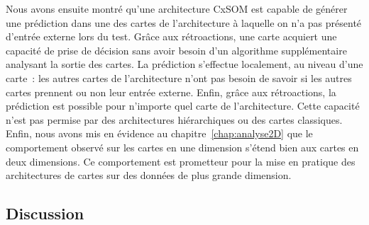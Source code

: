 Nous avons ensuite montré qu'une architecture CxSOM est capable de générer une prédiction dans une des cartes de l'architecture à laquelle on n'a pas présenté d'entrée externe lors du test. 
Grâce aux rétroactions, une carte acquiert une capacité de prise de décision sans avoir besoin d'un algorithme supplémentaire analysant la sortie des cartes. 
La prédiction s'effectue localement, au niveau d'une carte~: les autres cartes de l'architecture n'ont pas besoin de savoir si les autres cartes prennent ou non leur entrée externe.
Enfin, grâce aux rétroactions, la prédiction est possible pour n'importe quel carte de l'architecture. Cette capacité n'est pas permise par des architectures hiérarchiques ou des cartes classiques.
Enfin, nous avons mis en évidence au chapitre~\ref{chap:analyse2D} que le comportement observé sur les cartes en une dimension s'étend bien aux cartes en deux dimensions.
Ce comportement est prometteur pour la mise en pratique des architectures de cartes sur des données de plus grande dimension.


\subsection*{Discussion}

